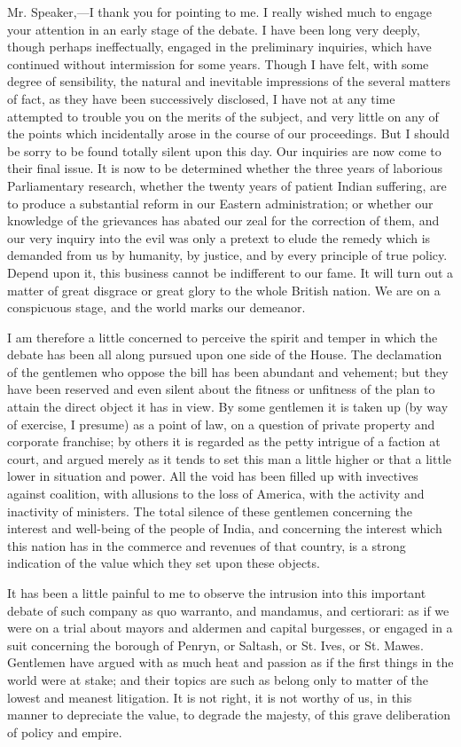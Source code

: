 Mr. Speaker,—I thank you for pointing to me. I really wished much to engage your attention in an early stage of the debate. I have been long very deeply, though perhaps ineffectually, engaged in the preliminary inquiries, which have continued without intermission for some years. Though I have felt, with some degree of sensibility, the natural and inevitable impressions of the several matters of fact, as they have been successively disclosed, I have not at any time attempted to trouble you on the merits of the subject, and very little on any of the points which incidentally arose in the course of our proceedings. But I should be sorry to be found totally silent upon this day. Our inquiries are now come to their final issue. It is now to be determined whether the three years of laborious Parliamentary research, whether the twenty years of patient Indian suffering, are to produce a substantial reform in our Eastern administration; or whether our knowledge of the grievances has abated our zeal for the correction of them, and our very inquiry into the evil was only a pretext to elude the remedy which is demanded from us by humanity, by justice, and by every principle of true policy. Depend upon it, this business cannot be indifferent to our fame. It will turn out a matter of great disgrace or great glory to the whole British nation. We are on a conspicuous stage, and the world marks our demeanor.

I am therefore a little concerned to perceive the spirit and temper in which the debate has been all along pursued upon one side of the House. The declamation of the gentlemen who oppose the bill has been abundant and vehement; but they have been reserved and even silent about the fitness or unfitness of the plan to attain the direct object it has in view. By some gentlemen it is taken up (by way of exercise, I presume) as a point of law, on a question of private property and corporate franchise; by others it is regarded as the petty intrigue of a faction at court, and argued merely as it tends to set this man a little higher or that a little lower in situation and power. All the void has been filled up with invectives against coalition, with allusions to the loss of America, with the activity and inactivity of ministers. The total silence of these gentlemen concerning the interest and well-being of the people of India, and concerning the interest which this nation has in the commerce and revenues of that country, is a strong indication of the value which they set upon these objects.

It has been a little painful to me to observe the intrusion into this important debate of such company as quo warranto, and mandamus, and certiorari: as if we were on a trial about mayors and aldermen and capital burgesses, or engaged in a suit concerning the borough of Penryn, or Saltash, or St. Ives, or St. Mawes. Gentlemen have argued with as much heat and passion as if the first things in the world were at stake; and their topics are such as belong only to matter of the lowest and meanest litigation. It is not right, it is not worthy of us, in this manner to depreciate the value, to degrade the majesty, of this grave deliberation of policy and empire.

